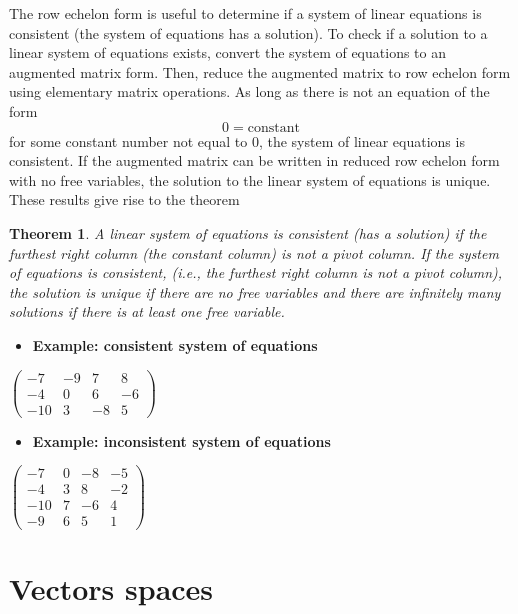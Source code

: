 \documentclass[
]{book}
\providecommand{\tightlist}{%
  \setlength{\itemsep}{0pt}\setlength{\parskip}{0pt}}
\newtheorem{theorem}{Theorem}[chapter]
\theoremstyle{definition}
\theoremstyle{definition}
\theoremstyle{definition}
\theoremstyle{remark}
\begin{document}
The row echelon form is useful to determine if a system of linear equations is consistent (the system of equations has a solution). To check if a solution to a linear system of equations exists, convert the system of equations to an augmented matrix form. Then, reduce the augmented matrix to row echelon form using elementary matrix operations. As long as there is not an equation of the form
\[
0 = \mbox{constant}
\]
for some constant number not equal to 0, the system of linear equations is consistent. If the augmented matrix can be written in reduced row echelon form with no free variables, the solution to the linear system of equations is unique. These results give rise to the theorem

\begin{theorem}
\protect\hypertarget{thm:unnamed-chunk-65}{}{\label{thm:unnamed-chunk-65} }A linear system of equations is consistent (has a solution) if the furthest right column (the constant column) is not a pivot column. If the system of equations is consistent, (i.e., the furthest right column is not a pivot column), the solution is unique if there are no free variables and there are infinitely many solutions if there is at least one free variable.
\end{theorem}

\begin{itemize}
\tightlist
\item
  \textbf{Example: consistent system of equations}
\end{itemize}

\(\begin{pmatrix} -7 & -9 & 7 & 8 \\ -4 & 0 & 6 & -6 \\ -10 & 3 & -8 & 5 \end{pmatrix}\)

\begin{itemize}
\tightlist
\item
  \textbf{Example: inconsistent system of equations}
\end{itemize}

\(\begin{pmatrix} -7 & 0 & -8 & -5 \\ -4 & 3 & 8 & -2 \\ -10 & 7 & -6 & 4 \\ -9 & 6 & 5 & 1 \end{pmatrix}\)

\hypertarget{vector-spaces}{%
\chapter{Vectors spaces}\label{vector-spaces}}
\end{document}
